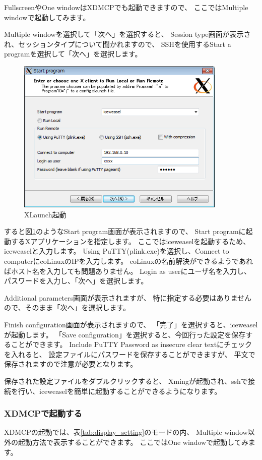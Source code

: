 \documentclass[mingoth,a4paper]{jsarticle}
\begin{document}
FullscreenやOne windowはXDMCPでも起動できますので、
ここではMultiple windowで起動してみます。

Multiple windowを選択して「次へ」を選択すると、
Session type画面が表示され、セッションタイプについて聞かれますので、
SSHを使用するStart a programを選択して「次へ」を選択します。
\begin{figure}[htbp]
 \begin{center}
  \includegraphics[width=100mm]{image200808/colinux_xlaunch_program.png}
 \end{center}
 \caption{XLaunch起動}
 \label{fig:colinux_xlaunch_program}
\end{figure}

すると図\ref{fig:colinux_xlaunch_program}のようなStart program画面が表示されますので、
Start programに起動するXアプリケーションを指定します。
ここではiceweaselを起動するため、iceweaselと入力します。
Using PuTTY(plink.exe)を選択し、Connect to computerにcoLinuxのIPを入力します。
coLinuxの名前解決ができるようであればホスト名を入力しても問題ありません。
Login as userにユーザ名を入力し、パスワードを入力し、「次へ」を選択します。

Additional parameters画面が表示されますが、
特に指定する必要はありませんので、そのまま「次へ」を選択します。

Finish configuration画面が表示されますので、
「完了」を選択すると、iceweaselが起動します。
「Save configuration」を選択すると、今回行った設定を保存することができます。
Include PuTTY Password as insecure clear textにチェックを入れると、
設定ファイルにパスワードを保存することができますが、
平文で保存されますので注意が必要となります。

保存された設定ファイルをダブルクリックすると、
Xmingが起動され、sshで接続を行い、iceweaselを簡単に起動することができるようになります。

\subsubsection{XDMCPで起動する}
XDMCPの起動では、表\ref{tab:display_setting}のモードの内、
Multiple window以外の起動方法で表示することができます。
ここではOne windowで起動してみます。
\end{document}
